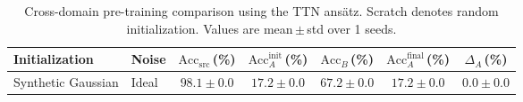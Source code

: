 \begin{table}[ht]
\centering
\caption{Cross-domain pre-training comparison using the TTN ans\"{a}tz. Scratch denotes random initialization. Values are mean\,$\pm$\,std over 1 seeds.}
\label{tab:crossdomain}
\setlength{\tabcolsep}{4pt}
\begin{tabular}{llccccc}
\toprule
\textbf{Initialization} & \textbf{Noise} & $\text{Acc}_\text{src}$\,(\%) & $\text{Acc}_A^{\text{init}}$\,(\%) & $\text{Acc}_B$\,(\%) & $\text{Acc}_A^{\text{final}}$\,(\%) & $\Delta_A$\,(\%) \\
\midrule
\midrule
Synthetic Gaussian & Ideal & $98.1 \pm 0.0$ & $17.2 \pm 0.0$ & $67.2 \pm 0.0$ & $17.2 \pm 0.0$ & $0.0 \pm 0.0$ \\
\midrule
\bottomrule
\end{tabular}
\end{table}
